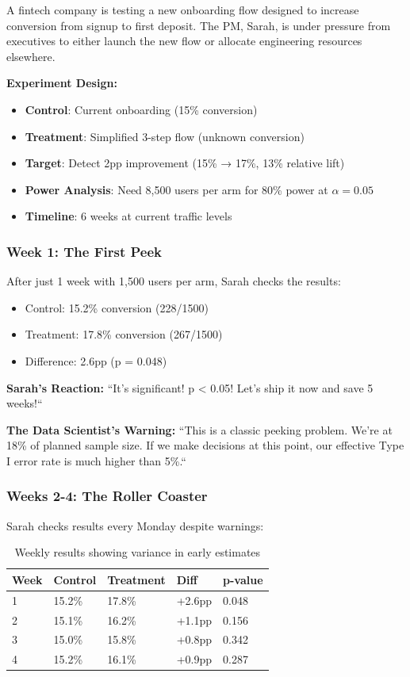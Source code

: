 A fintech company is testing a new onboarding flow designed to increase conversion from signup to first deposit. The PM, Sarah, is under pressure from executives to either launch the new flow or allocate engineering resources elsewhere.

\textbf{Experiment Design:}
\begin{itemize}
    \item \textbf{Control}: Current onboarding (15\% conversion)
    \item \textbf{Treatment}: Simplified 3-step flow (unknown conversion)
    \item \textbf{Target}: Detect 2pp improvement (15\% → 17\%, 13\% relative lift)
    \item \textbf{Power Analysis}: Need 8,500 users per arm for 80\% power at $\alpha=0.05$
    \item \textbf{Timeline}: 6 weeks at current traffic levels
\end{itemize}

\subsubsection{Week 1: The First Peek}

After just 1 week with 1,500 users per arm, Sarah checks the results:
\begin{itemize}
    \item Control: 15.2\% conversion (228/1500)
    \item Treatment: 17.8\% conversion (267/1500)
    \item Difference: 2.6pp (p = 0.048)
\end{itemize}

\textbf{Sarah's Reaction:} ``It's significant! p < 0.05! Let's ship it now and save 5 weeks!``

\textbf{The Data Scientist's Warning:} ``This is a classic peeking problem. We're at 18\% of planned sample size. If we make decisions at this point, our effective Type I error rate is much higher than 5\%.``

\subsubsection{Weeks 2-4: The Roller Coaster}

Sarah checks results every Monday despite warnings:

\begin{table}[h]
\centering
\begin{tabular}{lllll}
\toprule
\textbf{Week} & \textbf{Control} & \textbf{Treatment} & \textbf{Diff} & \textbf{p-value} \\
\midrule
1 & 15.2\% & 17.8\% & +2.6pp & 0.048 \\
2 & 15.1\% & 16.2\% & +1.1pp & 0.156 \\
3 & 15.0\% & 15.8\% & +0.8pp & 0.342 \\
4 & 15.2\% & 16.1\% & +0.9pp & 0.287 \\
\bottomrule
\end{tabular}
\caption{Weekly results showing variance in early estimates}
\end{table}

